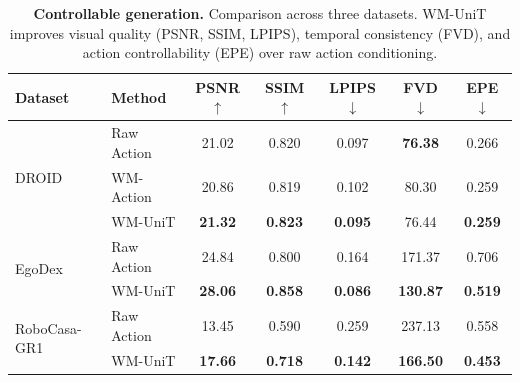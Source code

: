 \begin{table}[t]
  \caption{\textbf{Controllable generation.} Comparison across three datasets. WM-UniT improves visual quality (PSNR, SSIM, LPIPS), temporal consistency (FVD), and action controllability (EPE) over raw action conditioning.}
  \label{tab:wm-comparison}
  \centering
  \small
  \begin{tabular}{llccccc}
    \toprule
    Dataset & Method & PSNR $\uparrow$ & SSIM $\uparrow$ & LPIPS $\downarrow$ & FVD $\downarrow$ & EPE $\downarrow$ \\
    \midrule
    \multirow{3}{*}{DROID}
    & Raw Action    & 21.02 & 0.820 & 0.097 & \textbf{76.38} & 0.266 \\
    & WM-Action & 20.86 & 0.819 & 0.102 & 80.30 & 0.259 \\
    & WM-UniT & \textbf{21.32} & \textbf{0.823} & \textbf{0.095} & 76.44 & \textbf{0.259} \\
    \midrule
    \multirow{2}{*}{EgoDex}
    & Raw Action    & 24.84 & 0.800 & 0.164 & 171.37 & 0.706 \\
    & WM-UniT & \textbf{28.06} & \textbf{0.858} & \textbf{0.086} & \textbf{130.87} & \textbf{0.519} \\
    \midrule
    \multirow{2}{*}{RoboCasa-GR1}
    & Raw Action    & 13.45 & 0.590 & 0.259 & 237.13 & 0.558 \\
    & WM-UniT & \textbf{17.66} & \textbf{0.718} & \textbf{0.142} & \textbf{166.50} & \textbf{0.453} \\
    \bottomrule
  \end{tabular}
\end{table}
